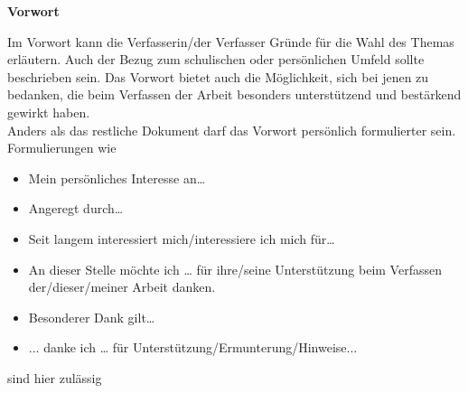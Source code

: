 \begin{center}\Large \textbf{Vorwort}\\ \end{center}

Im Vorwort kann die Verfasserin/der Verfasser Gründe für die Wahl des Themas erläutern.
Auch der Bezug zum schulischen oder persönlichen Umfeld sollte beschrieben sein.
Das Vorwort bietet auch die Möglichkeit, sich bei jenen zu bedanken, die beim Verfassen der Arbeit besonders unterstützend und bestärkend gewirkt haben.\\

Anders als das restliche Dokument darf das Vorwort persönlich formulierter sein.
Formulierungen wie 
\begin{itemize}
	\item Mein persönliches Interesse an…
	\item Angeregt durch…
	\item Seit langem interessiert mich/interessiere ich mich für…
	\item An dieser Stelle möchte ich … für ihre/seine Unterstützung beim Verfassen der/dieser/meiner Arbeit danken.
	\item Besonderer Dank gilt…
	\item ... danke ich … für Unterstützung/Ermunterung/Hinweise...
	
\end{itemize}
sind hier zulässig
\clearpage